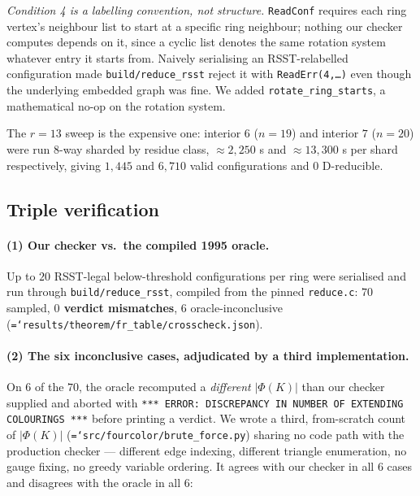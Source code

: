 \documentclass[11pt]{article}
\theoremstyle{definition}
\newcommand{\art}[1]{{\texttt{\hyphenchar\font=`\-\relax #1}}}
\begin{document}
\emph{Condition 4 is a labelling convention, not structure.} \texttt{ReadConf}
requires each ring vertex's neighbour list to start at a specific ring neighbour;
nothing our checker computes depends on it, since a cyclic list denotes the same
rotation system whatever entry it starts from. Naively serialising an RSST-relabelled
configuration made \texttt{build/reduce\_rsst} reject it with \texttt{ReadErr(4,\dots)}
even though the underlying embedded graph was fine. We added
\texttt{rotate\_ring\_starts}, a mathematical no-op on the rotation system.

The $r=13$ sweep is the expensive one: interior $6$ ($n=19$) and interior $7$
($n=20$) were run $8$-way sharded by residue class, $\approx 2{,}250$ s and
$\approx 13{,}300$ s per shard respectively, giving $1{,}445$ and $6{,}710$ valid
configurations and $0$ D-reducible.

\subsection{Triple verification}

\paragraph{(1) Our checker vs.\ the compiled 1995 oracle.} Up to $20$ RSST-legal
below-threshold configurations per ring were serialised and run through
\texttt{build/reduce\_rsst}, compiled from the pinned \texttt{reduce.c}: $70$ sampled,
\textbf{$0$ verdict mismatches}, $6$ oracle-inconclusive
(\art{results/theorem/fr\_table/crosscheck.json}).

\paragraph{(2) The six inconclusive cases, adjudicated by a third implementation.}
On $6$ of the $70$, the oracle recomputed a \emph{different} $|\Phi(K)|$ than our
checker supplied and aborted with \texttt{*** ERROR: DISCREPANCY IN NUMBER OF
EXTENDING COLOURINGS ***} before printing a verdict. We wrote a third, from-scratch
count of $|\Phi(K)|$ (\art{src/fourcolor/brute\_force.py}) sharing no code path with
the production checker --- different edge indexing, different triangle enumeration,
no gauge fixing, no greedy variable ordering. It agrees with our checker in all $6$
cases and disagrees with the oracle in all $6$:
\end{document}
